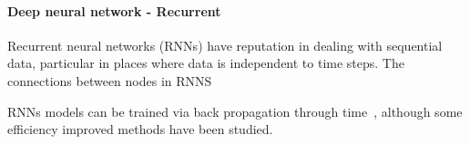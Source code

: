 \paragraph{Deep neural network - Recurrent}
Recurrent neural networks (RNNs) have reputation in dealing with sequential data, particular in places where data is independent to time steps. The connections between nodes in RNNS


RNNs models can be trained via back propagation through time~\cite{Goodfellow-et-al-2016}, although some efficiency improved methods have been studied.~\cite{963769,neco.1989,Gomez:2008:ANE:1390681.1390712}